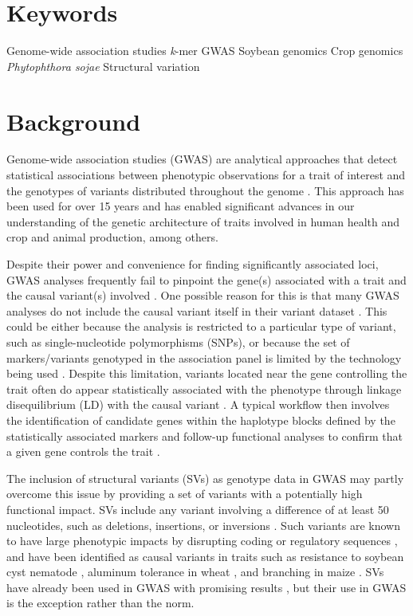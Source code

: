 \documentclass{article}
\begin{document}
\section*{Keywords}
Genome-wide association studies
\textit{k}-mer GWAS
Soybean genomics
Crop genomics
\textit{Phytophthora sojae}
Structural variation

\section*{Background}
Genome-wide association studies (GWAS) are analytical approaches that detect
statistical associations between phenotypic observations for a trait of
interest and the genotypes of variants distributed throughout the
genome \cite{tam2019}. This approach has been used for over 15 years
\cite{visscher2012} and has enabled significant advances in our understanding
of the genetic architecture of traits involved in human health
\cite[e.g.][]{wellcome2007gwas} and crop \cite{tibbs2021} and animal
\cite{ma2019} production, among others.

Despite their power and convenience for finding significantly associated loci,
GWAS analyses frequently fail to pinpoint the gene(s) associated with a trait and
the causal variant(s) involved \cite{tam2019}. One possible reason for this
is that many GWAS analyses do not include the causal variant itself in their variant dataset
\cite{tibbs2021}. This could be either because the analysis
is restricted to a particular type of variant, such as single-nucleotide
polymorphisms (SNPs), or because the set of markers/variants genotyped in the
association panel is limited by the technology being used
\cite[e.g.][]{bandillo2015, sonah2015}. Despite this limitation, variants
located near the gene controlling the trait often do appear statistically
associated with the phenotype through linkage disequilibrium (LD) with the
causal variant \cite{korte2013}.  A typical workflow then involves the
identification of candidate genes within the haplotype blocks defined by the
statistically associated markers and follow-up functional analyses to confirm
that a given gene controls the trait \cite[e.g.][]{wang2018, liu2020ps}.

The inclusion of structural variants (SVs) as genotype data in GWAS may partly overcome
this issue by providing a set of variants with a potentially high functional impact.
SVs include any variant involving a difference of at least 50 nucleotides, such as
deletions, insertions, or inversions \cite{ho2020}. Such variants are known to
have large phenotypic impacts by disrupting coding or regulatory sequences
\cite{marroni2014}, and have been identified as causal variants in traits such
as resistance to soybean cyst nematode \cite{cook2012}, aluminum tolerance in
wheat \cite{maron2013}, and branching in maize \cite{studer2011}.  SVs have
already been used in GWAS with promising results
\cite[e.g.][]{zhang2015, akakpo2020, dominguez2020, liu2020-pangenome}, but
their use in GWAS is the exception rather than the norm.
\end{document}
